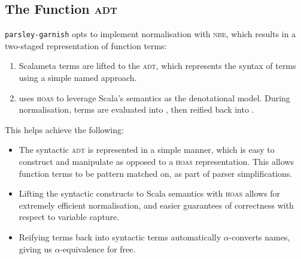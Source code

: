 \documentclass[../../../main.tex]{subfiles}
\begin{document}
\subsection{The Function \textsc{adt}}
\texttt{parsley-garnish} opts to implement normalisation with \textsc{nbe}, which results in a two-staged representation of function terms:
\begin{enumerate}
  \item Scalameta terms are lifted to the  \textsc{adt}, which represents the syntax of terms using a simple named approach.
  \item {} uses \textsc{hoas} to leverage Scala's semantics as the denotational model. During normalisation,  terms are evaluated into , then reified back into .
\end{enumerate}
%
This helps achieve the following:
\begin{itemize}
  \item The syntactic  \textsc{adt} is represented in a simple manner, which is easy to construct and manipulate as opposed to a \textsc{hoas} representation. This allows function terms to be pattern matched on, as part of parser simplifications.
  \item Lifting the syntactic constructs to Scala semantics with \textsc{hoas} allows for extremely efficient normalisation, and easier guarantees of correctness with respect to variable capture.
  \item Reifying  terms back into syntactic  terms automatically $\alpha$-converts names, giving us $\alpha$-equivalence for free.
\end{itemize}


\end{document}
